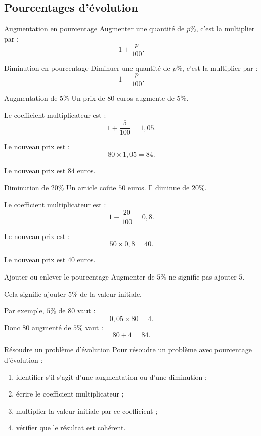 \documentclass[11pt,a4paper]{article}
\begin{document}
\subsection{Pourcentages d'évolution}

\begin{definitionbox}{Augmentation en pourcentage}
Augmenter une quantité de $p\%$, c'est la multiplier par :
\[
1+\frac{p}{100}.
\]
\end{definitionbox}

\begin{definitionbox}{Diminution en pourcentage}
Diminuer une quantité de $p\%$, c'est la multiplier par :
\[
1-\frac{p}{100}.
\]
\end{definitionbox}

\begin{examplebox}{Augmentation de $5\%$}
Un prix de $80$ euros augmente de $5\%$.

Le coefficient multiplicateur est :
\[
1+\frac{5}{100}=1{,}05.
\]

Le nouveau prix est :
\[
80\times 1{,}05=84.
\]

Le nouveau prix est $84$ euros.
\end{examplebox}

\begin{examplebox}{Diminution de $20\%$}
Un article coûte $50$ euros. Il diminue de $20\%$.

Le coefficient multiplicateur est :
\[
1-\frac{20}{100}=0{,}8.
\]

Le nouveau prix est :
\[
50\times 0{,}8=40.
\]

Le nouveau prix est $40$ euros.
\end{examplebox}

\begin{warningbox}{Ajouter ou enlever le pourcentage}
Augmenter de $5\%$ ne signifie pas ajouter $5$.

Cela signifie ajouter $5\%$ de la valeur initiale.

Par exemple, $5\%$ de $80$ vaut :
\[
0{,}05\times 80=4.
\]
Donc $80$ augmenté de $5\%$ vaut :
\[
80+4=84.
\]
\end{warningbox}

\begin{methodbox}{Résoudre un problème d'évolution}
Pour résoudre un problème avec pourcentage d'évolution :
\begin{enumerate}
    \item identifier s'il s'agit d'une augmentation ou d'une diminution ;
    \item écrire le coefficient multiplicateur ;
    \item multiplier la valeur initiale par ce coefficient ;
    \item vérifier que le résultat est cohérent.
\end{enumerate}
\end{methodbox}
\end{document}
